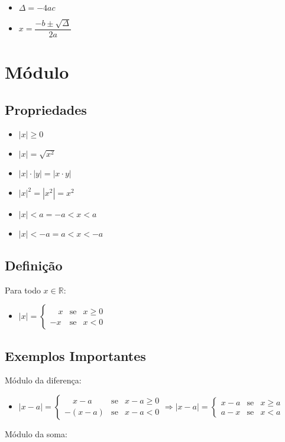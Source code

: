 \documentclass[12pt]{article}
\newcommand{\nl}{\hfill \newline}
\begin{document}
\begin{itemize}
\item $\Delta = -4ac$
\item $x = \dfrac{-b \pm \sqrt{\Delta}}{2a}$
\end{itemize}

\newpage

\section{Módulo}

\subsection{Propriedades}

\begin{itemize}
\item $|x| \geq 0$
\item $|x| = \sqrt{x^2}$
\item $|x| \cdot |y| = |x\cdot y|$
\item $|x|^2 = |x^2| = x^2$
\item $|x| < a = -a < x < a$
\item $|x| < -a = a < x < -a$
\end{itemize}

\subsection{Definição}

Para todo $x \in \mathbb{R}$:

\begin{itemize}
\item $|x| = 
\left\{\begin{array}{lcl}
\quad x & \text{se} & x \geq 0\\
-x & \text{se} & x < 0
\end{array}\right.$
\end{itemize}

\subsection{Exemplos Importantes}

Módulo da diferença:

\begin{itemize}
\item $ |x-a| =
\left\{\begin{array}{lcl}
\quad x-a & \text{se} & x-a \geq 0\\
-(x-a) & \text{se} & x-a < 0
\end{array}\right.
\Rightarrow
|x-a| = 
\left\{\begin{array}{lcl}
x-a & \text{se} & x \geq a\\
a-x & \text{se} & x < a
\end{array}\right.$
\end{itemize}
\nl
Módulo da soma:
\end{document}
